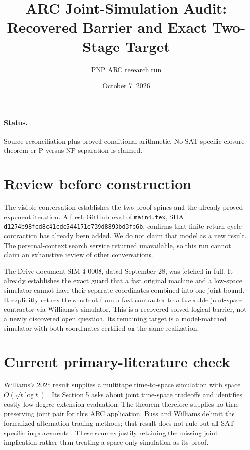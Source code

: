 \documentclass[11pt]{article}
\title{ARC Joint-Simulation Audit: Recovered Barrier and Exact Two-Stage Target}
\author{PNP ARC research run}
\date{October 7, 2026}
\begin{document}
\maketitle
\paragraph{Status.} Source reconciliation plus proved conditional arithmetic.
No SAT-specific closure theorem or P versus NP separation is claimed.

\section{Review before construction}
The visible conversation establishes the two proof spines and the already
proved exponent iteration. A fresh GitHub read of \texttt{main4.tex}, SHA
\texttt{d1274b98fcd8c41cde544171e739d8893bd3fb6b}, confirms that finite
return-cycle contraction has already been added. We do not claim that model
as a new result. The personal-context search service returned unavailable,
so this run cannot claim an exhaustive review of other conversations.

The Drive document SIM-4-0008, dated September 28, was fetched in full. It
already establishes the exact guard that a fast original machine and a
low-space simulator cannot have their separate coordinates combined into
one joint bound. It explicitly retires the shortcut from a fast contractor
to a favorable joint-space contractor via Williams's simulator. This is a
recovered solved logical barrier, not a newly discovered open question.
Its remaining target is a model-matched simulator with both coordinates
certified on the same realization.

\section{Current primary-literature check}
Williams's 2025 result supplies a multitape time-to-space simulation with
space $O(\sqrt{t\log t})$ \cite{williams2025joint}. Its Section 5 asks about
joint time-space tradeoffs and identifies costly low-degree-extension
evaluation. The theorem therefore supplies no time-preserving joint pair
for this ARC application. Buss and Williams delimit the formalized
alternation-trading methods; that result does not rule out all SAT-specific
improvements \cite{busslimitsjoint}. These sources justify retaining the
missing joint implication rather than treating a space-only simulation as
its proof.
\end{document}
